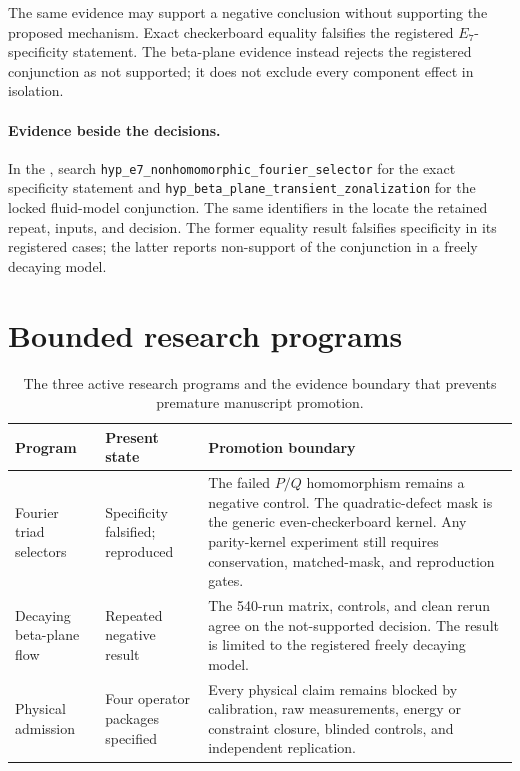 The same evidence may support a negative conclusion without supporting the
proposed mechanism. Exact checkerboard equality falsifies the registered
$E_7$-specificity statement. The beta-plane evidence instead rejects the
registered conjunction as not supported; it does not exclude every component
effect in isolation.

\paragraph{Evidence beside the decisions.}
In the , search
\nolinkurl{hyp_e7_nonhomomorphic_fourier_selector} for the exact specificity
statement and \nolinkurl{hyp_beta_plane_transient_zonalization} for the locked
fluid-model conjunction. The same identifiers in the
locate the retained repeat, inputs, and decision. The former equality result
falsifies specificity in its registered cases; the latter reports non-support
of the conjunction in a freely decaying model.

\section{Bounded research programs}

\begin{table}[htbp]
  \centering
  \small
  \begin{tabularx}{\textwidth}{>{\raggedright\arraybackslash}p{}>{\raggedright\arraybackslash}p{}X}
    \toprule
    Program & Present state & Promotion boundary \\
    \midrule
    Fourier triad selectors & Specificity falsified; reproduced & The failed $P/Q$
      homomorphism remains a negative control. The quadratic-defect mask is the
      generic even-checkerboard kernel. Any parity-kernel experiment still
      requires conservation, matched-mask, and reproduction gates. \\
    Decaying beta-plane flow & Repeated negative result & The 540-run matrix,
      controls, and clean rerun agree on the not-supported decision. The result
      is limited to the registered freely decaying model. \\
    Physical admission & Four operator packages specified & Every physical
      claim remains blocked by calibration, raw measurements, energy or
      constraint closure, blinded controls, and independent replication. \\
    \bottomrule
  \end{tabularx}
  \caption{The three active research programs and the evidence boundary that
  prevents premature manuscript promotion.}
  \label{tab:hypothesis-programs}
\end{table}


